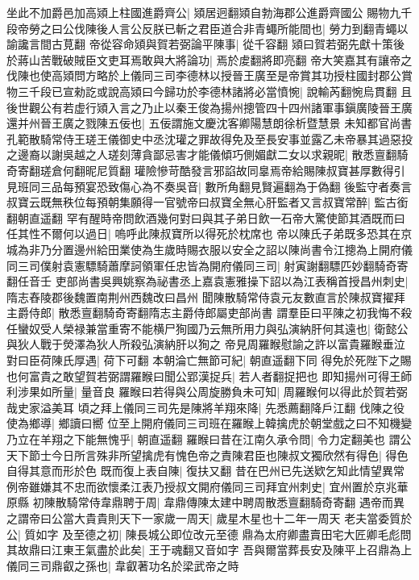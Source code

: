 坐此不加爵邑加高熲上柱國進爵齊公|{
	熲居迥翻熲自勃海郡公進爵齊國公}
賜物九千段帝勞之曰公伐陳後人言公反朕已斬之君臣道合非青蠅所能間也|{
	勞力到翻青蠅以諭讒言間古莧翻}
帝從容命熲與賀若弼論平陳事|{
	從千容翻}
熲曰賀若弼先獻十策後於蔣山苦戰破賊臣文吏耳焉敢與大將論功|{
	焉於䖍翻將即亮翻}
帝大笑嘉其有讓帝之伐陳也使高熲問方略於上儀同三司李德林以授晉王廣至是帝賞其功授柱國封郡公賞物三千段已宣勑訖或說高熲曰今歸功於李德林諸將必當憤惋|{
	說輸芮翻惋烏貫翻}
且後世觀公有若虚行熲入言之乃止以秦王俊為揚州摠管四十四州諸軍事鎭廣陵晉王廣還并州晉王廣之戮陳五佞也|{
	五佞謂施文慶沈客卿陽慧朗徐析暨慧景}
未知都官尚書孔範散騎常侍王瑳王儀御史中丞沈瓘之罪故得免及至長安事並露乙未帝暴其過惡投之邊裔以謝吳越之人瑳刻薄貪鄙忌害才能儀傾巧側媚獻二女以求親昵|{
	散悉亶翻騎奇寄翻瑳倉何翻昵尼質翻}
瓘險慘苛酷發言邪諂故同辠焉帝給賜陳叔寶甚厚數得引見班同三品每預宴恐致傷心為不奏吳音|{
	數所角翻見賢遍翻為于偽翻}
後監守者奏言叔寶云既無秩位每預朝集願得一官號帝曰叔寶全無心肝監者又言叔寶常醉|{
	監古銜翻朝直遥翻}
罕有醒時帝問飲酒幾何對曰與其子弟日飲一石帝大驚使節其酒既而曰任其性不爾何以過日|{
	嗚呼此陳叔寶所以得死於枕席也}
帝以陳氏子弟既多恐其在京城為非乃分置邊州給田業使為生歲時賜衣服以安全之詔以陳尚書令江摠為上開府儀同三司僕射袁憲驃騎蕭摩訶領軍任忠皆為開府儀同三司|{
	射寅謝翻驃匹妙翻騎奇寄翻任音壬}
吏部尚書吳興姚察為祕書丞上嘉袁憲雅操下詔以為江表稱首授昌州刺史|{
	隋志舂陵郡後魏置南荆州西魏改曰昌州}
聞陳散騎常侍袁元友數直言於陳叔寶擢拜主爵侍郎|{
	散悉亶翻騎奇寄翻隋志主爵侍郎屬吏部尚書}
謂羣臣曰平陳之初我悔不殺任蠻奴受人榮禄兼當重寄不能横尸狥國乃云無所用力與弘演納肝何其遠也|{
	衛懿公與狄人戰于熒澤為狄人所殺弘演納肝以狥之}
帝見周羅睺慰諭之許以富貴羅睺垂泣對曰臣荷陳氏厚遇|{
	荷下可翻}
本朝淪亡無節可紀|{
	朝直遥翻下同}
得免於死陛下之賜也何富貴之敢望賀若弼謂羅睺曰聞公郢漢捉兵|{
	若人者翻捉把也}
即知揚州可得王師利涉果如所量|{
	量音良}
羅睺曰若得與公周旋勝負未可知|{
	周羅睺何以得此於賀若弼哉史家溢美耳}
頃之拜上儀同三司先是陳將羊翔來降|{
	先悉薦翻降戶江翻}
伐陳之役使為鄉導|{
	鄉讀曰嚮}
位至上開府儀同三司班在羅睺上韓擒虎於朝堂戲之曰不知機變乃立在羊翔之下能無愧乎|{
	朝直遥翻}
羅睺曰昔在江南久承令問|{
	令力定翻美也}
謂公天下節士今日所言殊非所望擒虎有愧色帝之責陳君臣也陳叔文獨欣然有得色|{
	得色自得其意而形於色}
既而復上表自陳|{
	復扶又翻}
昔在巴州已先送欵乞知此情望異常例帝雖嫌其不忠而欲懷柔江表乃授叔文開府儀同三司拜宜州刺史|{
	宜州置於京兆華原縣}
初陳散騎常侍韋鼎聘于周|{
	韋鼎傳陳太建中聘周散悉亶翻騎奇寄翻}
遇帝而異之謂帝曰公當大貴貴則天下一家歲一周天|{
	歲星木星也十二年一周天}
老夫當委質於公|{
	質如字}
及至德之初|{
	陳長城公即位改元至德}
鼎為太府卿盡賣田宅大匠卿毛彪問其故鼎曰江東王氣盡於此矣|{
	王于魂翻又音如字}
吾與爾當葬長安及陳平上召鼎為上儀同三司鼎叡之孫也|{
	韋叡著功名於梁武帝之時}
